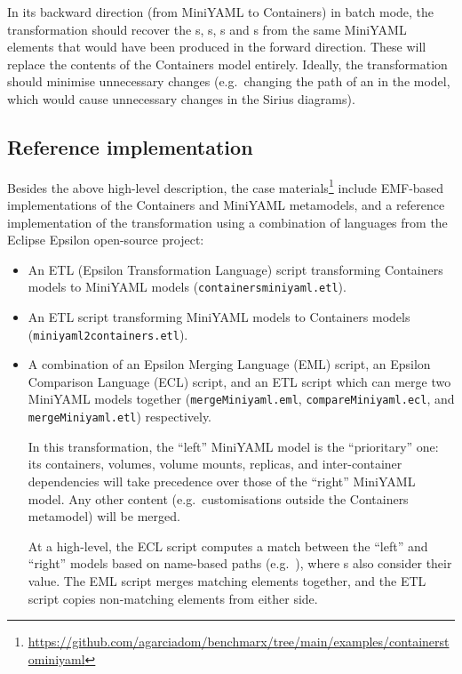 \documentclass[sigconf,review]{acmart}
\begin{document}
In its backward direction (from MiniYAML to Containers) in batch mode, the
transformation should recover the s, s,
s and s from the same MiniYAML elements
that would have been produced in the forward direction. These will replace the
contents of the Containers model entirely. Ideally, the transformation should
minimise unnecessary changes (e.g.\ changing the path of an  in
the model, which would cause unnecessary changes in the Sirius diagrams).

\subsection{Reference implementation}

\newcommand*{\file}[1]{\texttt{#1}}

Besides the above high-level description, the case materials\footnote{\url{https://github.com/agarciadom/benchmarx/tree/main/examples/containerstominiyaml}} include EMF-based
implementations of the Containers and MiniYAML metamodels, and a reference
implementation of the transformation using a combination of languages from the
Eclipse Epsilon open-source project:

\begin{itemize}
\item An ETL (Epsilon Transformation Language) script transforming Containers
  models to MiniYAML models (\file{con\-tai\-ners\-miniyaml.etl}).

\item An ETL script transforming MiniYAML models to Containers models
  (\file{miniyaml2containers.etl}).

\item A combination of an Epsilon Merging Language (EML) script, an Epsilon
  Comparison Language (ECL) script, and an ETL script which can merge two
  MiniYAML models together (\file{mergeMiniyaml.eml},
  \file{compareMiniyaml.ecl}, and \file{mergeMiniyaml.etl}) respectively.

  In this transformation, the ``left'' MiniYAML model is the ``prioritary'' one:
  its containers, volumes, volume mounts, replicas, and inter-container
  dependencies will take precedence over those of the ``right'' MiniYAML model.
  Any other content (e.g.\ customisations outside the Containers metamodel) will
  be merged.

  At a high-level, the ECL script computes a match between the ``left'' and
  ``right'' models based on name-based paths
  (e.g.\ ), where s also
  consider their value. The EML script merges matching elements together, and
  the ETL script copies non-matching elements from either side.
\end{itemize}
\end{document}
